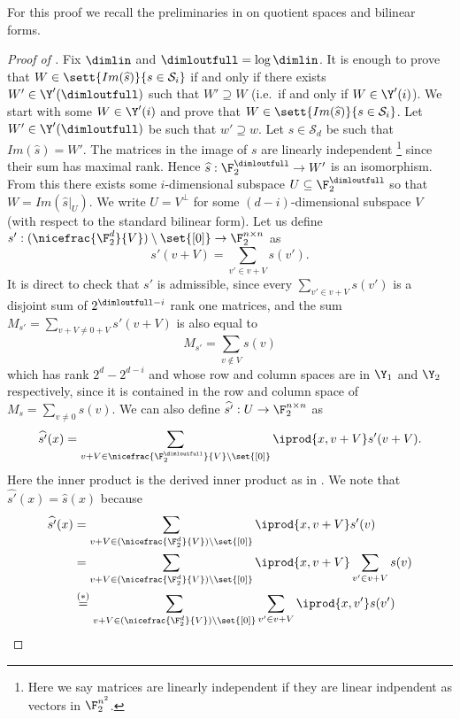 For this proof we recall the preliminaries in  on quotient spaces and bilinear forms.
\begin{proof}[Proof of ]
    Fix \(\dimlin\) and \(\dimloutfull = \log \dimlin\). It is enough to prove that \(W \in \sett{Im(\widehat{s})}{s \in \mathcal{S}_i}\) if and only if there exists \(W' \in \Y'(\dimloutfull)\) such that \(W' \supseteq W\) (i.e.\ if and only if \(W \in \Y'(i)\)). We start with some \(W \in \Y'(i)\) and prove that \(W \in \sett{Im(\widehat{s})}{s \in \mathcal{S}_i}\). Let \(W' \in \Y'(\dimloutfull)\) be such that \(w' \supseteq w\). Let \(s \in \mathcal{S}_d\) be such that \(Im(\widehat{s}) = W'\). The matrices in the image of \(s\) are linearly independent \footnote{Here we say matrices are linearly independent if they are linear indpendent as vectors in \(\F_2^{n^2}\).} since their sum has maximal rank. Hence \(\widehat{s}:\F_2^\dimloutfull \to W'\) is an isomorphism. From this there exists some \(i\)-dimensional subspace \(U \subseteq \F_2^{\dimloutfull}\) so that  \(W = Im(\widehat{s}|_U)\). We write \(U=V^\bot\) for some \((d-i)\)-dimensional subspace \(V\) (with respect to the standard bilinear form). Let us define \(s': (\nicefrac{\F_2^d}{V}) \setminus \set{[0]} \to \F_2^{n \times n}\) as
    \[s'(v+V) = \sum_{v' \in v+V} s(v').\]
    It is direct to check that \(s'\) is admissible, since every \(\sum_{v' \in v+V} s(v')\) is a disjoint sum of \(2^{\dimloutfull-i}\) rank one matrices, and the sum \(M_{s'} = \sum_{v+V \ne 0+V} s'(v+V)\) is also equal to
    \[M_{s'} = \sum_{v \notin V}s(v)\]
    which has rank \(2^d-2^{d-i}\) and whose row and column spaces are in \(\Y_1\) and \(\Y_2\) respectively, since it is contained in the row and column space of \(M_s = \sum_{v \ne 0}s(v)\). We can also define \(\widehat{s'}:U \to \F_2^{n \times n}\) as \[\widehat{s'}(x) = \sum_{v+V \in \nicefrac{\F_2^\dimloutfull}{V} \setminus \set{[0]}} \iprod{x,v+V} s'(v+V).\]
    Here the inner product is the derived inner product as in . We note that 
    \(\widehat{s'}(x) = \widehat{s}(x)\) because
    \begin{align*}
        \widehat{s'}(x) &= \sum_{v+V \in (\nicefrac{\F_2^d}{V}) \setminus \set{[0]}} \iprod{x,v+V} s'(v) \\
        &= \sum_{v+V \in (\nicefrac{\F_2^d}{V}) \setminus \set{[0]}} \iprod{x,v+V} \sum_{v' \in v+V} s(v) \\
        &\overset{(*)}{=} \sum_{v+V \in (\nicefrac{\F_2^d}{V}) \setminus \set{[0]}} \sum_{v' \in v+V}\iprod{x,v'} s(v') \\

\end{align*}
\end{proof}
